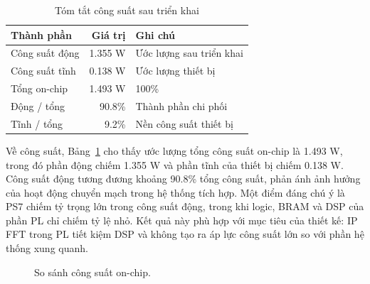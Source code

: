 ﻿\documentclass[conference]{IEEEtran}
\begin{document}
\begin{table}[H]
    \caption{Tóm tắt công suất sau triển khai}
    \centering
    \label{tab:power_summary}
    \begin{tabular}{lrl}
        \toprule
        \textbf{Thành phần} & \textbf{Giá trị} & \textbf{Ghi chú}         \\
        \midrule
        Công suất động      & 1.355 W          & Ước lượng sau triển khai \\
        Công suất tĩnh      & 0.138 W          & Ước lượng thiết bị       \\
        Tổng on-chip        & 1.493 W          & 100\%                    \\
        Động / tổng         & 90.8\%           & Thành phần chi phối      \\
        Tĩnh / tổng         & 9.2\%            & Nền công suất thiết bị   \\
        \bottomrule
    \end{tabular}
\end{table}

Về công suất, Bảng~\ref{tab:power_summary} cho thấy ước lượng tổng công suất on-chip là 1.493 W, trong đó phần động chiếm 1.355 W và phần tĩnh của thiết bị chiếm 0.138 W. Công suất động tương đương khoảng 90.8\% tổng công suất, phản ánh ảnh hưởng của hoạt động chuyển mạch trong hệ thống tích hợp. Một điểm đáng chú ý là PS7 chiếm tỷ trọng lớn trong công suất động, trong khi logic, BRAM và DSP của phần PL chỉ chiếm tỷ lệ nhỏ. Kết quả này phù hợp với mục tiêu của thiết kế: IP FFT trong PL tiết kiệm DSP và không tạo ra áp lực công suất lớn so với phần hệ thống xung quanh.

\begin{figure}[htbp]
    \centering
    \caption{So sánh công suất on-chip.}
    \label{fig:power_comparison}
\end{figure}
\end{document}
